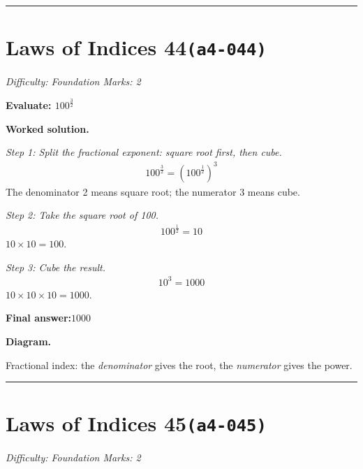 \documentclass[11pt]{article}
\newcommand{\question}[1]{\par\medskip\noindent\textbf{#1}\par}
\begin{document}
\medskip\hrule

\section*{Laws of Indices 44\quad\small\texttt{(a4-044)}}
\textit{Difficulty: Foundation \quad\textbar\quad Marks: 2}

\question{Evaluate: \( 100^{\frac{3}{2}} \)}

\textbf{Worked solution.}

\textit{Step 1: Split the fractional exponent: square root first, then cube.}
\[\begin{gathered}
100^{\frac{3}{2}} = \left(100^{\frac{1}{2}}\right)^3
\end{gathered}\]
The denominator 2 means square root; the numerator 3 means cube.

\textit{Step 2: Take the square root of 100.}
\[\begin{gathered}
100^{\frac{1}{2}} = 10
\end{gathered}\]
\( 10 \times 10 = 100 \).

\textit{Step 3: Cube the result.}
\[\begin{gathered}
10^3 = 1000
\end{gathered}\]
\( 10 \times 10 \times 10 = 1000 \).

\begin{answerbox}
\textbf{Final answer:}\quad \(\displaystyle 1000\)
\end{answerbox}
\textbf{Diagram.}

\begin{center}
\end{center}
\small Fractional index: the \emph{denominator} gives the root, the \emph{numerator} gives the power.\normalsize

\medskip\hrule

\section*{Laws of Indices 45\quad\small\texttt{(a4-045)}}
\textit{Difficulty: Foundation \quad\textbar\quad Marks: 2}
\end{document}
